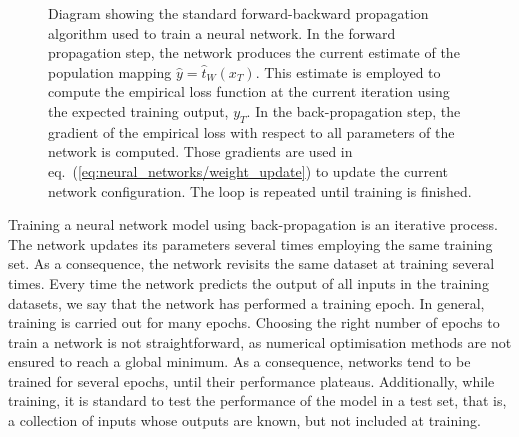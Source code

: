 \begin{figure}[H]
    \centering
    \caption{
        Diagram showing the standard forward-backward propagation algorithm used to train a neural
        network. In the forward propagation step, the network produces the current estimate of the
        population mapping $\hat{y} = \hat{t}_W(x_T)$. This estimate is employed to compute the
        empirical loss function at the current iteration using the expected training output, $y_T$.
        In the back-propagation step, the gradient of the empirical loss with respect to all
        parameters of the network is computed. Those gradients are used in
        eq.~(\ref{eq:neural_networks/weight_update}) to update the current network configuration.
        The loop is repeated until training is finished.
    }\label{fig:neural_networks/backpropagation}
\end{figure}

Training a neural network model using back-propagation is an iterative process. The network updates
its parameters several times employing the same training set. As a consequence, the network revisits
the same dataset at training several times. Every time the network predicts the output of all inputs
in the training datasets, we say that the network has performed a training epoch. In general,
training is carried out for many epochs. Choosing the right number of epochs to train a network is
not straightforward, as numerical optimisation methods are not ensured to reach a global minimum. As
a consequence, networks tend to be trained for several epochs, until their performance plateaus.
Additionally, while training, it is standard to test the performance of the model in a test set,
that is, a collection of inputs whose outputs are known, but not included at training.


